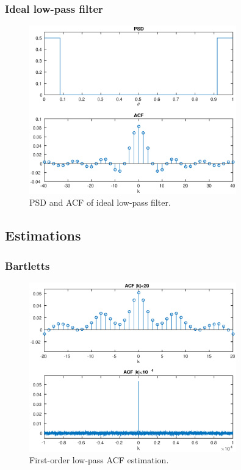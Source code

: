 \documentclass[a4paper,12pt]{article}
\begin{document}


\subsubsection{Ideal low-pass filter}

\begin{figure}[h]
\centering
\includegraphics[width=0.8\textwidth]{bilder/Lab1/Lab1fig2.eps}
\caption{PSD and ACF of ideal low-pass filter.}
\label{fig:Lab1fig2}
\end{figure}




\subsection{Estimations}




\subsubsection{Bartletts}

\begin{figure}[h]
\centering
\includegraphics[width=0.8\textwidth]{bilder/Lab1/Lab1fig3.eps}
\caption{First-order low-pass ACF estimation.}
\label{fig:Lab1fig3}
\end{figure}
\end{document}
